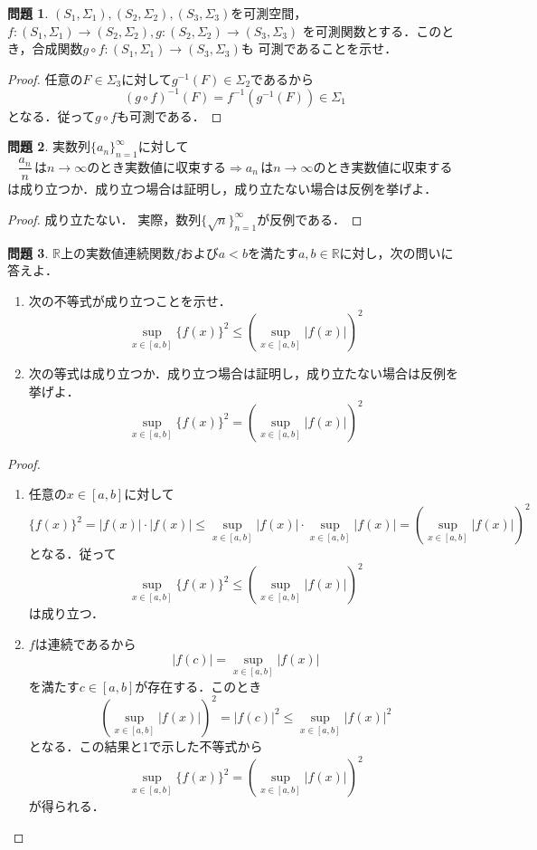\documentclass{jsarticle}
\theoremstyle{definition}
\newtheorem{qst}{問題}
\begin{document}
\begin{qst}
$(S_1,\Sigma_1),(S_2,\Sigma_2),(S_3,\Sigma_3)$を可測空間，
$f\colon(S_1,\Sigma_1)\to(S_2,\Sigma_2),g\colon(S_2,\Sigma_2)\to(S_3,\Sigma_3)$
を可測関数とする．このとき，合成関数$g\circ f\colon(S_1,\Sigma_1)\to(S_3,\Sigma_3)$も
可測であることを示せ．
\end{qst}
\begin{proof}
任意の$F\in\Sigma_3$に対して$g^{-1}(F)\in\Sigma_2$であるから
\[ (g\circ f)^{-1}(F)=f^{-1}(g^{-1}(F))\in\Sigma_1 \]
となる．従って$g\circ f$も可測である．
\end{proof}

\begin{qst}
実数列$\{a_n\}_{n=1}^\infty$に対して
\[
\frac{a_n}{n}\,\text{は}n\to\infty\text{のとき実数値に収束する}
\Rightarrow a_n\,\text{は}n\to\infty\text{のとき実数値に収束する}
\]
は成り立つか．成り立つ場合は証明し，成り立たない場合は反例を挙げよ．
\end{qst}
\begin{proof}
成り立たない．
実際，数列$\{\sqrt{n}\}_{n=1}^\infty$が反例である．
\end{proof}

\begin{qst}
$\mathbb{R}$上の実数値連続関数$f$および$a<b$を満たす$a,b\in\mathbb{R}$に対し，次の問いに答えよ．
\begin{enumerate}
\item 次の不等式が成り立つことを示せ．
\[ \sup_{x\in[a,b]}\{f(x)\}^2\leq\left(\sup_{x\in[a,b]}|f(x)|\right)^2 \]
\item 次の等式は成り立つか．成り立つ場合は証明し，成り立たない場合は反例を挙げよ．
\[ \sup_{x\in[a,b]}\{f(x)\}^2=\left(\sup_{x\in[a,b]}|f(x)|\right)^2 \]
\end{enumerate}
\end{qst}
\begin{proof}
\begin{enumerate}
\item
任意の$x\in[a,b]$に対して
\[
\{f(x)\}^2=|f(x)|\cdot|f(x)|\leq\sup_{x\in[a,b]}|f(x)|\cdot\sup_{x\in[a,b]}|f(x)|
=\left(\sup_{x\in[a,b]}|f(x)|\right)^2
\]
となる．従って
\[ \sup_{x\in[a,b]}\{f(x)\}^2\leq\left(\sup_{x\in[a,b]}|f(x)|\right)^2 \]
は成り立つ．
\item
$f$は連続であるから
\[ |f(c)|=\sup_{x\in[a,b]}|f(x)| \]
を満たす$c\in[a,b]$が存在する．このとき
\[ \left(\sup_{x\in[a,b]}|f(x)|\right)^2=|f(c)|^2\leq\sup_{x\in[a,b]}|f(x)|^2 \]
となる．この結果と1で示した不等式から
\[ \sup_{x\in[a,b]}\{f(x)\}^2=\left(\sup_{x\in[a,b]}|f(x)|\right)^2 \]
が得られる．
\end{enumerate}
\end{proof}
\end{document}

